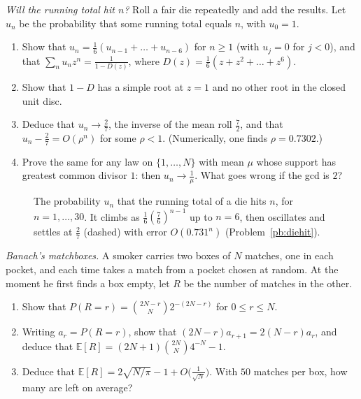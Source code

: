 \begin{exercise}[$\star\star$]\label{pb:diehit}
\emph{Will the running total hit $n$?} Roll a fair die repeatedly and add the results. Let $u_n$ be the probability that some running total equals $n$, with $u_0=1$.
\begin{enumerate}[label=(\alph*)]
\item Show that $u_n=\frac16(u_{n-1}+\dots+u_{n-6})$ for $n\ge1$ (with $u_j=0$ for $j<0$), and that $\sum_nu_nz^n=\frac1{1-D(z)}$, where $D(z)=\frac16(z+z^2+\dots+z^6)$.
\item Show that $1-D$ has a simple root at $z=1$ and no other root in the closed unit disc.
\item Deduce that $u_n\to\frac27$, the inverse of the mean roll $\frac72$, and that $u_n-\frac27=O(\rho^n)$ for some $\rho<1$. (Numerically, one finds $\rho=0.7302$.)
\item Prove the same for any law on $\{1,\dots,N\}$ with mean $\mu$ whose support has greatest common divisor $1$: then $u_n\to\frac1\mu$. What goes wrong if the gcd is $2$?
\end{enumerate}
\end{exercise}

\begin{figure}[ht]
\centering
{}
\caption{The probability $u_n$ that the running total of a die hits $n$, for $n=1,\dots,30$. It climbs as $\frac16(\frac76)^{n-1}$ up to $n=6$, then oscillates and
settles at $\frac27$ (dashed) with error $O(0.731^n)$ (Problem~\ref{pb:diehit}).}
\label{fig:diehit}
\end{figure}

\begin{exercise}[$\star\star$]\label{pb:banach}
\emph{Banach's matchboxes.} A smoker carries two boxes of $N$ matches, one in each pocket, and each time takes a match from a pocket chosen at random. At the moment he first
finds a box empty, let $R$ be the number of matches in the other.
\begin{enumerate}[label=(\alph*)]
\item Show that $P(R=r)=\binom{2N-r}N2^{-(2N-r)}$ for $0\le r\le N$.
\item Writing $a_r=P(R=r)$, show that $(2N-r)a_{r+1}=2(N-r)a_r$, and deduce that $\mathbb E[R]=(2N+1)\binom{2N}N4^{-N}-1$.
\item Deduce that $\mathbb E[R]=2\sqrt{N/\pi}-1+O\bigl(\frac1{\sqrt N}\bigr)$. With $50$ matches per box, how many are left on average?
\end{enumerate}
\end{exercise}

